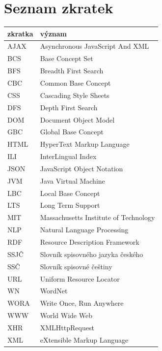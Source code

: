 \documentclass[a4paper, 11pt, oneside, showtrims]{book}
\begin{document}
	\newpage

	{
		\tableofcontents

		\adjustmtc %
		\adjustmtc %
	}


		\chapter*{Seznam zkratek}
		\label{cha:seznamzkratek}

			\begin{table}[h!]
			\label{tab:seznamzkratek}

				\begin{tabular}{l | l}
					\textbf{zkratka} & \textbf{význam} \\\hline
					AJAX & Asynchronous JavaScript And XML \\
					BCS & Base Concept Set \\
					BFS & Breadth First Search \\
					CBC & Common Base Concept \\
					CSS & Cascading Style Sheets \\
					DFS & Depth	First Search \\
					DOM & Document Object Model \\
					GBC & Global Base Concept \\
					HTML & HyperText Markup Language \\
					ILI & InterLingual Index \\
					JSON & JavaScript Object Notation \\
					JVM & Java Virtual Machine \\
					LBC & Local Base Concept \\
					LTS & Long Term Support \\
					MIT & Massachusetts Institute of Technology \\
					NLP & Natural Language Processing \\
					RDF & Resource Description Framework \\
					SSJČ & Slovník spisovného jazyka českého \\
					SSČ & Slovník spisovné češtiny \\
					URL & Uniform Resource Locator \\
					WN & WordNet \\
					WORA & Write Once, Run Anywhere \\ 
					WWW & World Wide Web \\
					XHR & XMLHttpRequest \\
					XML & eXtensible Markup Language \\
				\end{tabular}
			\end{table}
\end{document}
